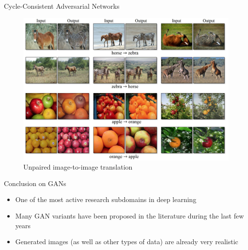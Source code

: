 \documentclass[xcolor=pdftex,dvipsnames,table,mathserif]{beamer}
\begin{document}
\begin{frame}{Cycle-Consistent Adversarial Networks}
\begin{figure}
\includegraphics[width=.75\columnwidth]{../graphics/DomainTransformation}
\caption{Unpaired image-to-image translation \cite{zhu2017unpaired}}
\end{figure}
\end{frame}

\begin{frame}{Conclusion on GANs}

  \begin{itemize}
  \item One of the most active research subdomains in deep learning
  \item Many GAN variants have been proposed in the literature during the last few years
  \item Generated images (as well as other types of data) are already very realistic
  \end{itemize}
\end{frame}
\end{document}
